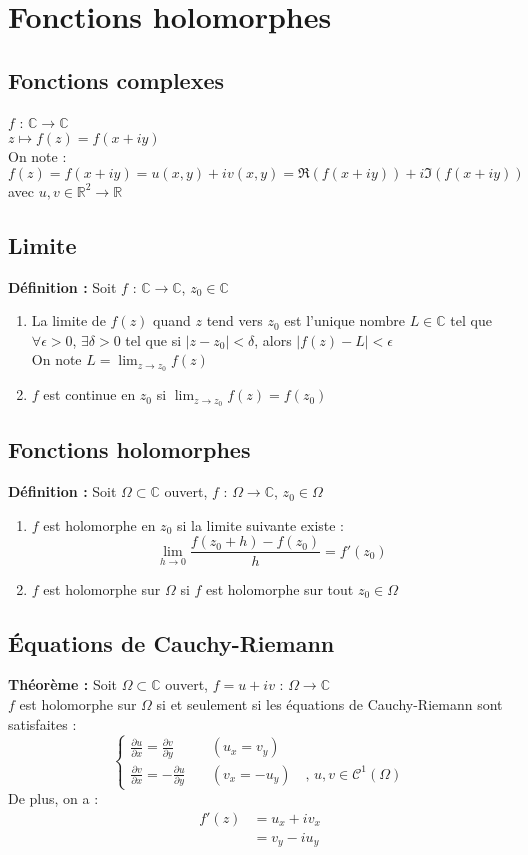 \section{Fonctions holomorphes}
\subsection{Fonctions complexes}
$f$ : $\mathbb{C}\to\mathbb{C}$\\
$z\mapsto f(z) = f(x+iy)$\\
On note :
$$f(z)=f(x+iy)=u(x,y)+iv(x,y)=\Re(f(x+iy))+i\Im(f(x+iy))$$
avec $u,v\in \mathbb{R}^2\to\mathbb{R}$

\subsection{Limite}
\textbf{Définition :} Soit $f$ : $\mathbb{C}\to\mathbb{C}$, $z_0\in\mathbb{C}$
\begin{enumerate}
    \item La limite de $f(z)$ quand $z$ tend vers $z_0$ est l'unique nombre $L\in\mathbb{C}$ tel que\\
    $\forall\epsilon>0$, $\exists\delta>0$ tel que si $|z-z_0|<\delta$, alors $|f(z)-L|<\epsilon$\\
    On note $L = \lim_{z \to z_0} f(z)$
    \item $f$ est continue en $z_0$ si $\lim_{z \to z_0}f(z) = f(z_0)$
\end{enumerate}

\subsection{Fonctions holomorphes}
\textbf{Définition :} Soit $\Omega\subset\mathbb{C}$ ouvert, $f$ : $\Omega\to\mathbb{C}$, $z_0\in\Omega$
\begin{enumerate}
    \item $f$ est holomorphe en $z_0$ si la limite suivante existe :
    $$\lim_{h\to0}\frac{f(z_0+h)-f(z_0)}{h}=f'(z_0)$$
    \item $f$ est holomorphe sur $\Omega$ si $f$ est holomorphe sur tout $z_0\in\Omega$
\end{enumerate}

\subsection{Équations de Cauchy-Riemann}
\textbf{Théorème :} Soit $\Omega\subset\mathbb{C}$ ouvert, $f=u+iv$ : $\Omega\to\mathbb{C}$\\
$f$ est holomorphe sur $\Omega$ si et seulement si les équations de Cauchy-Riemann sont satisfaites :
$$
\begin{cases}
    \frac{\partial u}{\partial x} = \frac{\partial v}{\partial y} \quad &(u_x=v_y) \\
    \frac{\partial v}{\partial x} = -\frac{\partial u}{\partial y} \quad &(v_x=-u_y) \quad \text{, }u,v\in\mathcal{C}^1(\Omega) 
\end{cases}
$$
De plus, on a :
\begin{align*}
    f'(z)&=u_x+iv_x\\
    &=v_y-iu_y
\end{align*}

